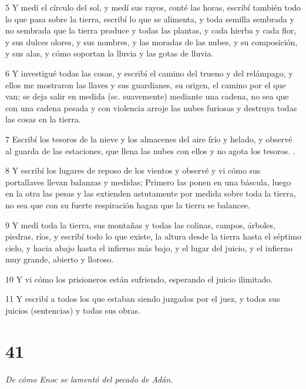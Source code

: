 \par 5 Y medí el círculo del sol, y medí sus rayos, conté las horas, escribí también todo lo que pasa sobre la tierra, escribí lo que se alimenta, y toda semilla sembrada y no sembrada que la tierra produce y todas las plantas, y cada hierba y cada flor, y sus dulces olores, y sus nombres, y las moradas de las nubes, y su composición, y sus alas, y cómo soportan la lluvia y las gotas de lluvia.

\par 6 Y investigué todas las cosas, y escribí el camino del trueno y del relámpago, y ellos me mostraron las llaves y sus guardianes, su origen, el camino por el que van; se deja salir en medida (sc. suavemente) mediante una cadena, no sea que con una cadena pesada y con violencia arroje las nubes furiosas y destruya todas las cosas en la tierra.

\par 7 Escribí los tesoros de la nieve y los almacenes del aire frío y helado, y observé al guarda de las estaciones, que llena las nubes con ellos y no agota los tesoros. .

\par 8 Y escribí los lugares de reposo de los vientos y observé y vi cómo sus portallaves llevan balanzas y medidas; Primero las ponen en una báscula, luego en la otra las pesas y las extienden astutamente por medida sobre toda la tierra, no sea que con su fuerte respiración hagan que la tierra se balancee.

\par 9 Y medí toda la tierra, sus montañas y todas las colinas, campos, árboles, piedras, ríos, y escribí todo lo que existe, la altura desde la tierra hasta el séptimo cielo, y hacia abajo hasta el infierno más bajo, y el lugar del juicio, y el infierno muy grande, abierto y lloroso.

\par 10 Y vi cómo los prisioneros están sufriendo, esperando el juicio ilimitado.

\par 11 Y escribí a todos los que estaban siendo juzgados por el juez, y todos sus juicios (sentencias) y todas sus obras.

\chapter{41}

\par \textit{De cómo Enoc se lamentó del pecado de Adán.}

